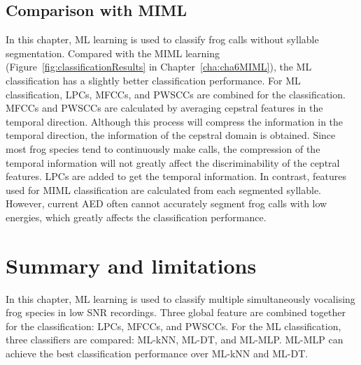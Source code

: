 \subsection{Comparison with MIML}
In this chapter, ML learning is used to classify frog calls without syllable segmentation. Compared with the MIML learning (Figure~\ref{fig:classificationResults} in Chapter~\ref{cha:cha6MIML}), the ML classification has a slightly better classification performance. For ML classification, LPCs, MFCCs, and PWSCCs are combined for the classification. MFCCs and PWSCCs are calculated by averaging cepstral features in the temporal direction. Although this process will compress the information in the temporal direction, the information of the cepstral domain is obtained. Since most frog species tend to continuously make calls, the compression of the temporal information will not greatly affect the discriminability of the ceptral features.
LPCs are added to get the temporal information. In contrast, features used for MIML classification are calculated from each segmented syllable. However, current AED often cannot accurately segment frog calls with low energies, which greatly affects the classification performance.




\section{Summary and limitations}
In this chapter, ML learning is used to classify multiple simultaneously vocalising frog species in low SNR recordings. Three global feature are combined together for the classification: LPCs, MFCCs, and PWSCCs. For the ML classification, three classifiers are compared: ML-kNN, ML-DT, and ML-MLP. ML-MLP can achieve the best classification performance over ML-kNN and ML-DT.









